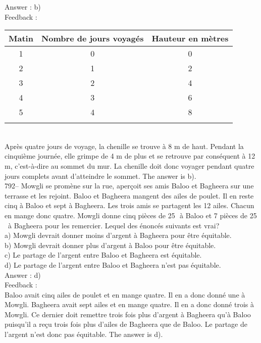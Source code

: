 \documentclass[letterpaper, 12pt]{article}
\begin{document}
Answer : b)\\

Feedback : \\

\begin{tabular}{|c|c|c|} \hline
{\bf Matin} & {\bf Nombre de jours voyag\'es} & {\bf Hauteur en m\`etres} \\
\hline \hline

1 & 0 & 0 \\ \hline
2 & 1 & 2\\ \hline
3 & 2 & 4\\ \hline
4 & 3 & 6\\ \hline
5 & 4 & 8\\ \hline
\multicolumn{3}{c}{}\\

\end{tabular}\\

Apr\`es quatre jours de voyage, la chenille se trouve \`a 8 m de haut.
Pendant la cinqui\`eme journ\'ee, elle grimpe de 4 m de plus et se retrouve
par cons\'equent \`a 12 m, c'est-\`a-dire au sommet du mur.  La chenille
doit donc voyager pendant quatre jours complets avant d'atteindre le sommet.
  The answer is b).\\

792-- Mowgli se prom\`ene sur la rue, aper\c coit ses amis Baloo et Bagheera
sur une terrasse et les rejoint.  Baloo et Bagheera mangent des ailes de
poulet.  Il en reste cinq \`a Baloo et sept \`a Bagheera.  Les trois amis se
partagent les 12 ailes.  Chacun en mange donc quatre.  Mowgli donne cinq
pi\`eces de 25\,\cent \ \`a Baloo et 7 pi\`eces de 25\,\cent \ \`a Bagheera
pour les remercier.  Lequel des \'enonc\'es suivants est vrai?\\
a) Mowgli devrait donner moins d'argent \`a Bagheera pour \^etre
\'equitable.\\
b) Mowgli devrait donner plus d'argent \`a Baloo pour \^etre \'equitable.\\
c) Le partage de l'argent entre Baloo et Bagheera est \'equitable.\\
d) Le partage de l'argent entre Baloo et Bagheera n'est pas \'equitable.\\

Answer : d)\\

Feedback : \\
Baloo avait cinq ailes de poulet et en mange quatre.  Il en a donc donn\'e
une \`a Mowgli.  Bagheera avait sept ailes et en mange quatre.  Il en a donc
donn\'e trois \`a Mowgli.  Ce dernier doit remettre trois fois plus d'argent
\`a Bagheera qu'\`a Baloo puisqu'il a re\c cu trois fois plus d'ailes de
Bagheera que de Baloo.  Le partage de l'argent n'est donc pas \'equitable.
The answer is d).\\
\end{document}
